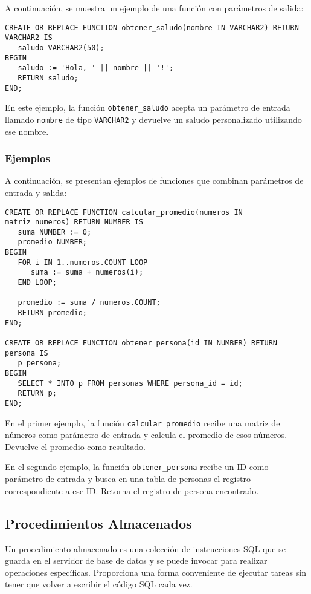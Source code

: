 \documentclass[executivepaper]{article}
\begin{document}
A continuación, se muestra un ejemplo de una función con parámetros de salida:

\begin{lstlisting}
CREATE OR REPLACE FUNCTION obtener_saludo(nombre IN VARCHAR2) RETURN VARCHAR2 IS
   saludo VARCHAR2(50);
BEGIN
   saludo := 'Hola, ' || nombre || '!';
   RETURN saludo;
END;
\end{lstlisting}

En este ejemplo, la función \texttt{obtener\_saludo} acepta un parámetro de entrada llamado \texttt{nombre} de tipo \texttt{VARCHAR2} y devuelve un saludo personalizado utilizando ese nombre.

\subsubsection*{Ejemplos}

A continuación, se presentan ejemplos de funciones que combinan parámetros de entrada y salida:

\begin{lstlisting}
CREATE OR REPLACE FUNCTION calcular_promedio(numeros IN matriz_numeros) RETURN NUMBER IS
   suma NUMBER := 0;
   promedio NUMBER;
BEGIN
   FOR i IN 1..numeros.COUNT LOOP
      suma := suma + numeros(i);
   END LOOP;
   
   promedio := suma / numeros.COUNT;
   RETURN promedio;
END;

CREATE OR REPLACE FUNCTION obtener_persona(id IN NUMBER) RETURN persona IS
   p persona;
BEGIN
   SELECT * INTO p FROM personas WHERE persona_id = id;
   RETURN p;
END;
\end{lstlisting}

En el primer ejemplo, la función \texttt{calcular\_promedio} recibe una matriz de números como parámetro de entrada y calcula el promedio de esos números. Devuelve el promedio como resultado.

En el segundo ejemplo, la función \texttt{obtener\_persona} recibe un ID como parámetro de entrada y busca en una tabla de personas el registro correspondiente a ese ID. Retorna el registro de persona encontrado.

\subsection{Procedimientos Almacenados}

Un procedimiento almacenado es una colección de instrucciones SQL que se guarda en el servidor de base de datos y se puede invocar para realizar operaciones específicas. Proporciona una forma conveniente de ejecutar tareas sin tener que volver a escribir el código SQL cada vez.
\end{document}
